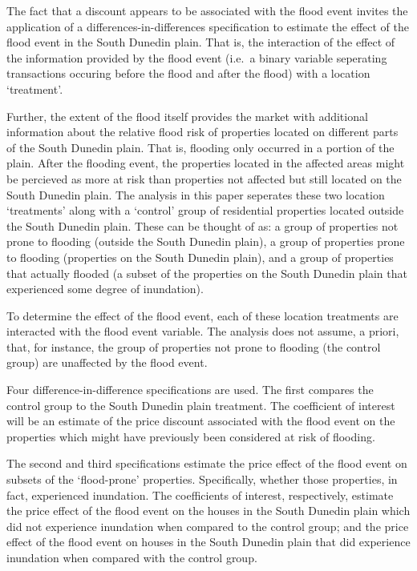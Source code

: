 \documentclass[]{article}
\begin{document}
The fact that a discount appears to be associated with the flood event
invites the application of a differences-in-differences specification to
estimate the effect of the flood event in the South Dunedin plain. That
is, the interaction of the effect of the information provided by the
flood event (i.e.~a binary variable seperating transactions occuring
before the flood and after the flood) with a location `treatment'.

Further, the extent of the flood itself provides the market with
additional information about the relative flood risk of properties
located on different parts of the South Dunedin plain. That is, flooding
only occurred in a portion of the plain. After the flooding event, the
properties located in the affected areas might be percieved as more at
risk than properties not affected but still located on the South Dunedin
plain. The analysis in this paper seperates these two location
`treatments' along with a `control' group of residential properties
located outside the South Dunedin plain. These can be thought of as: a
group of properties not prone to flooding (outside the South Dunedin
plain), a group of properties prone to flooding (properties on the South
Dunedin plain), and a group of properties that actually flooded (a
subset of the properties on the South Dunedin plain that experienced
some degree of inundation).

To determine the effect of the flood event, each of these location
treatments are interacted with the flood event variable. The analysis
does not assume, a priori, that, for instance, the group of properties
not prone to flooding (the control group) are unaffected by the flood
event.

Four difference-in-difference specifications are used. The first
compares the control group to the South Dunedin plain treatment. The
coefficient of interest will be an estimate of the price discount
associated with the flood event on the properties which might have
previously been considered at risk of flooding.

The second and third specifications estimate the price effect of the
flood event on subsets of the `flood-prone' properties. Specifically,
whether those properties, in fact, experienced inundation. The
coefficients of interest, respectively, estimate the price effect of the
flood event on the houses in the South Dunedin plain which did not
experience inundation when compared to the control group; and the price
effect of the flood event on houses in the South Dunedin plain that did
experience inundation when compared with the control group.
\end{document}
